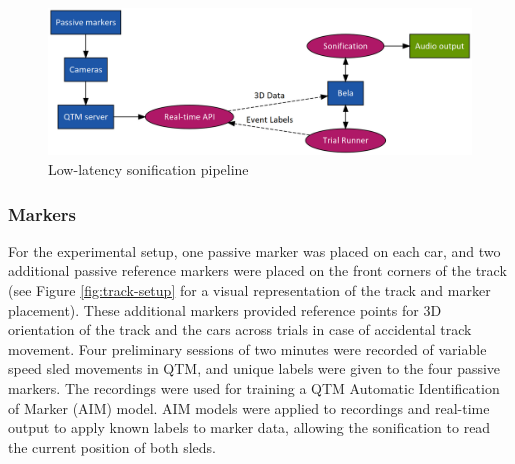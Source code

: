 \documentclass[10pt,a4paper,onecolumn]{article}
\begin{document}
\begin{figure}[h]

{\centering \includegraphics[width=1\linewidth]{figures/exp-graph} 

}

\caption{Low-latency sonification pipeline}\label{fig:exp-graph}
\end{figure}

\hypertarget{markers}{%
\subsubsection{Markers}\label{markers}}

For the experimental setup, one passive marker was placed on each car, and two additional passive reference markers were placed on the front corners of the track (see Figure \ref{fig:track-setup} for a visual representation of the track and marker placement). These additional markers provided reference points for 3D orientation of the track and the cars across trials in case of accidental track movement. Four preliminary sessions of two minutes were recorded of variable speed sled movements in QTM, and unique labels were given to the four passive markers. The recordings were used for training a QTM Automatic Identification of Marker (AIM) model. AIM models were applied to recordings and real-time output to apply known labels to marker data, allowing the sonification to read the current position of both sleds.
\end{document}
